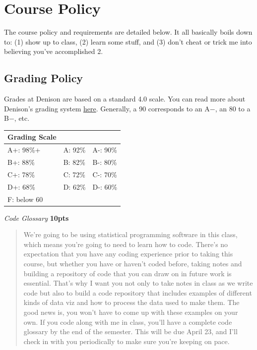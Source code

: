 \documentclass[11pt,]{article}
\begin{document}
\hypertarget{course-policy}{%
\section{Course Policy}\label{course-policy}}

The course policy and requirements are detailed below. It all basically
boils down to: (1) show up to class, (2) learn some stuff, and (3) don't
cheat or trick me into believing you've accomplished 2.

\hypertarget{grading-policy}{%
\subsection{Grading Policy}\label{grading-policy}}

Grades at Denison are based on a standard 4.0 scale. You can read more
about Denison's grading system
\href{https://catalog.denison.edu/catalog/academic-program/grading-system-evaluation/}{here}.
Generally, a 90 corresponds to an A\(-\), an 80 to a B\(-\), etc.

\clearpage

\begin{longtable}[]{@{}lll@{}}
\toprule()
\textbf{Grading Scale} & & \\
\midrule()
\endhead
A+: 98\%+ & A: 92\% & A-: 90\% \\
B+: 88\% & B: 82\% & B-: 80\% \\
C+: 78\% & C: 72\% & C-: 70\% \\
D+: 68\% & D: 62\% & D-: 60\% \\
F: below 60 & & \\
\bottomrule()
\end{longtable}

\emph{Code Glossary} \textbf{10pts}

\begin{quote}
We're going to be using statistical programming software in this class,
which means you're going to need to learn how to code. There's no
expectation that you have any coding experience prior to taking this
course, but whether you have or haven't coded before, taking notes and
building a repository of code that you can draw on in future work is
essential. That's why I want you not only to take notes in class as we
write code but also to build a code repository that includes examples of
different kinds of data viz and how to process the data used to make
them. The good news is, you won't have to come up with these examples on
your own. If you code along with me in class, you'll have a complete
code glossary by the end of the semester. This will be due April 23, and
I'll check in with you periodically to make sure you're keeping on pace.
\end{quote}
\end{document}
